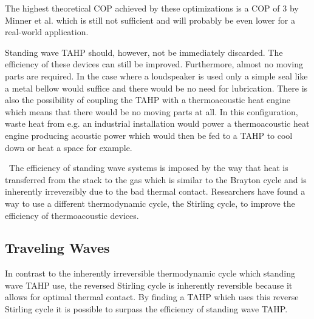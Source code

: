 \documentclass[a4paper]{article}
\newcommand{\newpara}
    {
      \bigbreak{}
      \noindent
    }
\begin{document}
The highest theoretical COP achieved by these optimizations is a COP of 3 by Minner et al.\cite{minner1996optimizing} which is still not sufficient and will probably be even lower for a real-world application.
\newpara{}
Standing wave TAHP should, however, not be immediately discarded. The efficiency of these devices can still be improved. Furthermore, almost no moving parts are required. In the case where a loudspeaker is used only a simple seal like a metal bellow would suffice and there would be no need for lubrication. There is also the possibility of coupling the TAHP with a thermoacoustic heat engine which means that there would be no moving parts at all. In this configuration, waste heat from e.g. an industrial installation would power a thermoacoustic heat engine producing acoustic power which would then be fed to a TAHP to cool down or heat a space for example.
\newpara{}\
The efficiency of standing wave systems is imposed by the way that heat is transferred from the stack to the gas which is similar to the Brayton cycle and is inherently irreversibly due to the bad thermal contact. Researchers have found a way to use a different thermodynamic cycle, the Stirling cycle, to improve the efficiency of thermoacoustic devices.\cite{ceperleyStirling}

\subsection{Traveling Waves\cite{spoelstraHighTemperature,BackHauseDetailedStudy,powerofsound,weiTravellingwave}}
In contrast to the inherently irreversible thermodynamic cycle which standing wave TAHP use, the reversed Stirling cycle is inherently reversible because it allows for optimal thermal contact. By finding a TAHP which uses this reverse Stirling cycle it is possible to surpass the efficiency of standing wave TAHP.\@
\end{document}
